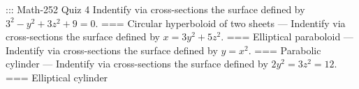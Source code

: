::: Math-252 Quiz 4
Indentify via cross-sections the surface defined by \(3^2-y^2+3z^2+9=0\).
===
Circular hyperboloid of two sheets
---
Indentify via cross-sections the surface defined by \(x=3y^2+5z^2\).
===
Elliptical paraboloid
---
Indentify via cross-sections the surface defined by \(y=x^2\).
===
Parabolic cylinder
---
Indentify via cross-sections the surface defined by  \(2y^2=3z^2=12\).
===
Elliptical cylinder
